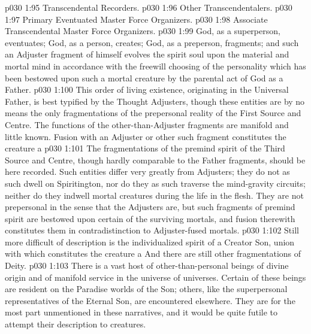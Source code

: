 \vs p030 1:95 \bibnobreakspace Transcendental Recorders.
\vs p030 1:96 \bibnobreakspace Other Transcendentalers.
\vs p030 1:97 \bibnobreakspace Primary Eventuated Master Force Organizers.
\vs p030 1:98 \bibnobreakspace Associate Transcendental Master Force Organizers.
\vs p030 1:99 \pc God, as a superperson, eventuates; God, as a person, creates; God, as a preperson, fragments; and such an Adjuster fragment of himself evolves the spirit soul upon the material and mortal mind in accordance with the freewill choosing of the personality which has been bestowed upon such a mortal creature by the parental act of God as a Father.
\vsetspace
\vs p030 1:100 \bibnobreakspace {} This order of living existence, originating in the Universal Father, is best typified by the Thought Adjusters, though these entities are by no means the only fragmentations of the prepersonal reality of the First Source and Centre. The functions of the other\hyp{}than\hyp{}Adjuster fragments are manifold and little known. Fusion with an Adjuster or other such fragment constitutes the creature a 
\vs p030 1:101 The fragmentations of the premind spirit of the Third Source and Centre, though hardly comparable to the Father fragments, should be here recorded. Such entities differ very greatly from Adjusters; they do not as such dwell on Spiritington, nor do they as such traverse the mind\hyp{}gravity circuits; neither do they indwell mortal creatures during the life in the flesh. They are not prepersonal in the sense that the Adjusters are, but such fragments of premind spirit are bestowed upon certain of the surviving mortals, and fusion therewith constitutes them  in contradistinction to Adjuster\hyp{}fused mortals.
\vs p030 1:102 Still more difficult of description is the individualized spirit of a Creator Son, union with which constitutes the creature a  And there are still other fragmentations of Deity.
\vsetspace
\vs p030 1:103 \bibnobreakspace {} There is a vast host of other\hyp{}than\hyp{}personal beings of divine origin and of manifold service in the universe of universes. Certain of these beings are resident on the Paradise worlds of the Son; others, like the superpersonal representatives of the Eternal Son, are encountered elsewhere. They are for the most part unmentioned in these narratives, and it would be quite futile to attempt their description to  creatures.

